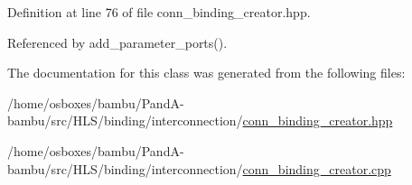 Definition at line 76 of file conn\+\_\+binding\+\_\+creator.\+hpp.



Referenced by add\+\_\+parameter\+\_\+ports().



The documentation for this class was generated from the following files\+:\begin{DoxyCompactItemize}
\item 
/home/osboxes/bambu/\+Pand\+A-\/bambu/src/\+H\+L\+S/binding/interconnection/\hyperlink{conn__binding__creator_8hpp}{conn\+\_\+binding\+\_\+creator.\+hpp}\item 
/home/osboxes/bambu/\+Pand\+A-\/bambu/src/\+H\+L\+S/binding/interconnection/\hyperlink{conn__binding__creator_8cpp}{conn\+\_\+binding\+\_\+creator.\+cpp}\end{DoxyCompactItemize}
